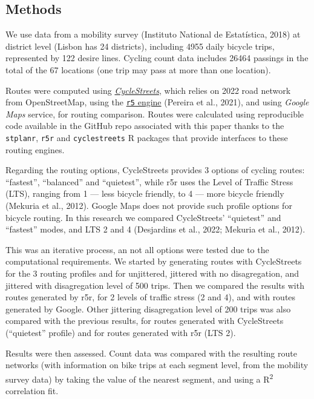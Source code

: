 \documentclass{isprs} %
\begin{document}
\hypertarget{methods}{%
\subsection{Methods}\label{methods}}

We use data from a mobility survey (Instituto National de Estatística, 2018) at district level (Lisbon has 24 districts), including 4955 daily bicycle trips, represented by 122 desire lines.
Cycling count data includes 26464 passings in the total of the 67 locations (one trip may pass at more than one location).

Routes were computed using \href{https://cyclestreets.net}{\emph{CycleStreets}}, which relies on 2022 road network from OpenStreetMap, using the \href{https://ipeagit.github.io/r5r/}{\texttt{r5} engine} (Pereira et al., 2021), and using \emph{Google Maps} service, for routing comparison.
Routes were calculated using reproducible code available in the GitHub repo associated with this paper thanks to the \texttt{stplanr}, \texttt{r5r} and \texttt{cyclestreets} R packages that provide interfaces to these routing engines.

Regarding the routing options, CycleStreets provides 3 options of cycling routes: ``fastest'', ``balanced'' and ``quietest'', while r5r uses the Level of Traffic Stress (LTS), ranging from 1 --- less bicycle friendly, to 4 --- more bicycle friendly (Mekuria et al., 2012). Google Maps does not provide such profile options for bicycle routing.
In this research we compared CycleStreets' ``quietest'' and ``fastest'' modes, and LTS 2 and 4 (Desjardins et al., 2022; Mekuria et al., 2012).

This was an iterative process, an not all options were tested due to the computational requirements. We started by generating routes with CycleStreets for the 3 routing profiles and for unjittered, jittered with no disagregation, and jittered with disagregation level of 500 trips. Then we compared the results with routes generated by r5r, for 2 levels of traffic stress (2 and 4), and with routes generated by Google. Other jittering disagregation level of 200 trips was also compared with the previous results, for routes generated with CycleStreets (``quietest'' profile) and for routes generated with r5r (LTS 2).

Results were then assessed. Count data was compared with the resulting route networks (with information on bike trips at each segment level, from the mobility survey data) by taking the value of the nearest segment, and using a R\textsuperscript{2} correlation fit.
\end{document}
